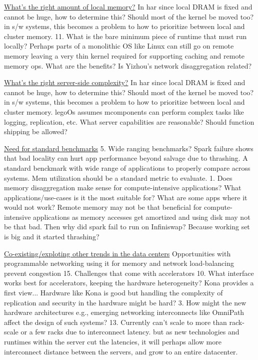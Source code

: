 \vspace{3pt}
\noindent \uline{What's the right amount of local memory?}
In har
since local DRAM is fixed and cannot be huge, how to 
determine this? Should most of the kernel be moved too?
in s/w systems, this becomes a problem to how to 
prioritize between local and cluster memory. 
11. What is the bare minimum piece of runtime that must run 
locally? Perhaps parts of a monolithic OS like Linux can 
still go on remote memory leaving a very thin kernel 
required for supporting caching and remote memory ops. 
What are the benefits? Is Yizhou's network disaggregation 
related?


\vspace{3pt}
\noindent \uline{What's the right server-side complexity?}
In har
since local DRAM is fixed and cannot be huge, how to 
determine this? Should most of the kernel be moved too?
in s/w systems, this becomes a problem to how to 
prioritize between local and cluster memory. 
legoOs assumes mcomponents can perform complex tasks like 
logging, replication, etc. 
What server capabilities are reasonable? Should function 
shipping be allowed?


\vspace{3pt}
\noindent \uline{Need for standard benchmarks}
5. Wide ranging benchmarks? Spark failure shows that 
bad locality can hurt app performance beyond salvage due 
to thrashing. A standard benckmark with wide range of 
applications to properly compare across systems.
Mem utilization should be a standard metric to evaluate.
1. Does memory disaggregation make sense for 
compute-intensive applications? What applications/use-cases
is it the most suitable for? What are some apps where it 
would not work? Remote memory may not be that beneficial for 
compute-intensive applications as memory accesses 
get amortized and using disk may not be that bad. 
Then why did spark fail to run on Infiniswap? 
Because working set is big and it started thrashing? 


\vspace{3pt}
\noindent \uline{Co-existing/exploting other trends 
in the data centers}
Opportunities with programmable networking
using it for memory and network load-balancing 
prevent congestion
15. Challenges that come with accelerators 
10. What interface works best for accelerators, keeping 
the hardware heterogeneity? 
Kona provides a first view...
Hardware like Kona is good but handling the
complexity of replication and security in the 
hardware might be hard?
3. How might the new hardware architectures e.g., 
emerging networking interconnects like OmniPath 
affect the design of such systems? 
13. Currently can't scale to more than rack-scale or a few 
racks due to interconnect latency. but 
as new technologies and runtimes within 
the server cut the latencies, it will perhaps 
allow more interconnect distance between the 
servers, and grow to an entire datacenter. 


%